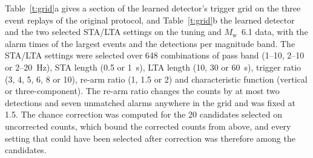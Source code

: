 \documentclass[11pt,a4paper]{article}
\newcommand{\Mw}{$M_\mathrm{w}$}
\newcommand{\stalta}{STA/LTA}
\begin{document}
Table~\ref{t:grid}a gives a section of the learned detector's trigger grid on the
three event replays of the original protocol, and Table~\ref{t:grid}b the learned
detector and the two selected \stalta{} settings on the tuning and \Mw{}~6.1 data,
with the alarm times of the largest events and the detections per magnitude band.
The \stalta{} settings were selected over 648 combinations of pass band (1--10, 2--10
or 2--20~Hz), STA length (0.5 or 1~s), LTA length (10, 30 or 60~s), trigger ratio (3,
4, 5, 6, 8 or 10), re-arm ratio (1, 1.5 or 2) and characteristic function (vertical or
three-component). The re-arm ratio changes the counts by at most two detections and
seven unmatched alarms anywhere in the grid and was fixed at 1.5. The chance
correction was computed for the 20 candidates selected on uncorrected counts, which
bound the corrected counts from above, and every setting that could have been
selected after correction was therefore among the candidates.
\end{document}
